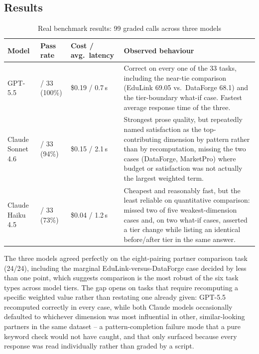 \subsection{Results}
\label{subsec:chapter7-benchmark-results}
\begin{table}[H]
  \centering
  \caption{Real benchmark results: 99 graded calls across three models}
  \label{tab:chapter7-model-benchmark}
  \begin{tabularx}{\linewidth}{>{\raggedright\arraybackslash}p{3.2cm}>{\raggedright\arraybackslash}p{1.9cm}>{\raggedright\arraybackslash}p{1.9cm}X}
    \toprule
    \textbf{Model} & \textbf{Pass rate} & \textbf{Cost / avg.\ latency} & \textbf{Observed behaviour} \\
    \midrule
    GPT-5.5 & 33 / 33 (100\%) & \$0.19 / 0.7\,s & Correct on every one of the 33 tasks, including the near-tie comparison (EduLink 69.05 vs.\ DataForge 68.1) and the tier-boundary what-if case. Fastest average response time of the three. \\
    Claude Sonnet 4.6 & 31 / 33 (94\%) & \$0.15 / 2.1\,s & Strongest prose quality, but repeatedly named satisfaction as the top-contributing dimension by pattern rather than by recomputation, missing the two cases (DataForge, MarketPro) where budget or satisfaction was not actually the largest weighted term. \\
    Claude Haiku 4.5 & 24 / 33 (73\%) & \$0.04 / 1.2\,s & Cheapest and reasonably fast, but the least reliable on quantitative comparison: missed two of five weakest-dimension cases and, on two what-if cases, asserted a tier change while listing an identical before/after tier in the same answer. \\
    \bottomrule
  \end{tabularx}
\end{table}

The three models agreed perfectly on the eight-pairing partner comparison task (24/24), including the marginal EduLink-versus-DataForge case decided by less than one point, which suggests comparison is the most robust of the six task types across model tiers. The gap opens on tasks that require recomputing a specific weighted value rather than restating one already given: GPT-5.5 recomputed correctly in every case, while both Claude models occasionally defaulted to whichever dimension was most influential in other, similar-looking partners in the same dataset -- a pattern-completion failure mode that a pure keyword check would not have caught, and that only surfaced because every response was read individually rather than graded by a script.

